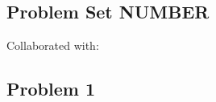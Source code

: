 \documentclass[12 pt]{article}
\begin{document}
	\begin{center}
		\section*{Problem Set NUMBER}
	\end{center}
	
	\noindent Collaborated with: \\
	
	\subsection*{Problem 1}
\end{document}
